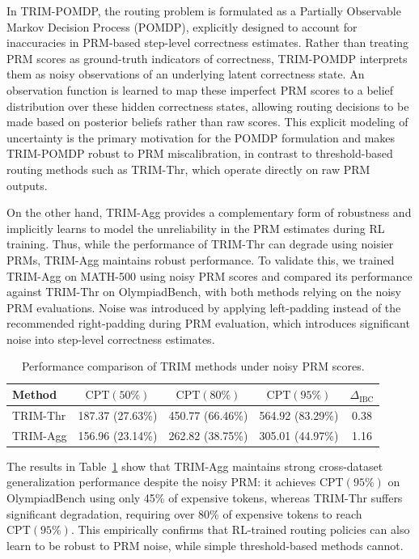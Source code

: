 \documentclass{article}
\theoremstyle{plain}
\theoremstyle{definition}
\theoremstyle{remark}
\begin{document}
In TRIM-POMDP, the routing problem is formulated as a Partially Observable Markov Decision Process (POMDP), explicitly designed to account for inaccuracies in PRM-based step-level correctness estimates. Rather than treating PRM scores as ground-truth indicators of correctness, TRIM-POMDP interprets them as noisy observations of an underlying latent correctness state. An observation function is learned to map these imperfect PRM scores to a belief distribution over these hidden correctness states, allowing routing decisions to be made based on posterior beliefs rather than raw scores. This explicit modeling of uncertainty is the primary motivation for the POMDP formulation and makes TRIM-POMDP robust to PRM miscalibration, in contrast to threshold-based routing methods such as TRIM-Thr, which operate directly on raw PRM outputs.

On the other hand, TRIM-Agg provides a complementary form of robustness and implicitly learns to model the unreliability in the PRM estimates during RL training. Thus, while the performance of TRIM-Thr can degrade using noisier PRMs, TRIM-Agg maintains robust performance. To validate this, we trained TRIM-Agg on MATH-500 using noisy PRM scores and compared its performance against TRIM-Thr on OlympiadBench, with both methods relying on the noisy PRM evaluations. Noise was introduced by applying left-padding instead of the recommended right-padding during PRM evaluation, which introduces significant noise into step-level correctness estimates.

\begin{table}[t]
\caption{\footnotesize Performance comparison of TRIM methods under noisy PRM scores.}
\label{tab:robustness}
\centering
\begin{tabular}{lcccc}
\toprule
Method & $\mathrm{CPT}(50\%)$ & $\mathrm{CPT}(80\%)$ & $\mathrm{CPT}(95\%)$ & $\Delta_{\text{IBC}}$\\
\midrule
TRIM-Thr & 187.37 (27.63\%) & 450.77 (66.46\%) & 564.92 (83.29\%) & 0.38 \\
TRIM-Agg & 156.96 (23.14\%) & 262.82 (38.75\%) & 305.01 (44.97\%) & 1.16 \\
\bottomrule
\end{tabular}
\end{table}

The results in Table~\ref{tab:robustness} show that TRIM-Agg maintains strong cross-dataset generalization performance despite the noisy PRM: it achieves $\mathrm{CPT}(95\%)$ on OlympiadBench using only 45\% of expensive tokens, whereas TRIM-Thr suffers significant degradation, requiring over 80\% of expensive tokens to reach $\mathrm{CPT}(95\%)$. This empirically confirms that RL-trained routing policies can also learn to be robust to PRM noise, while simple threshold-based methods cannot.
\end{document}
